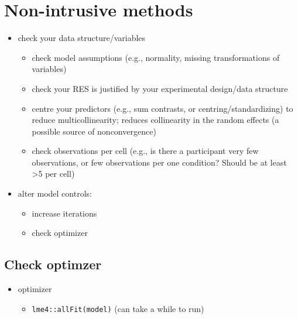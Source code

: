 \documentclass[
  letterpaper,
  DIV=11,
  numbers=noendperiod]{scrartcl}
\providecommand{\tightlist}{%
  \setlength{\itemsep}{0pt}\setlength{\parskip}{0pt}}\usepackage{longtable,booktabs,array}
\begin{document}
\hypertarget{non-intrusive-methods}{%
\section{Non-intrusive methods}\label{non-intrusive-methods}}

\begin{itemize}
\tightlist
\item
  check your data structure/variables

  \begin{itemize}
  \tightlist
  \item
    check model assumptions (e.g., normality, missing transformations of
    variables)
  \item
    check your RES is justified by your experimental design/data
    structure
  \item
    centre your predictors (e.g., sum contrasts, or
    centring/standardizing) to reduce multicollinearity; reduces
    collinearity in the random effects (a possible source of
    nonconvergence)
  \item
    check observations per cell (e.g., is there a participant very few
    observations, or few observations per one condition? Should be at
    least \textgreater5 per cell)
  \end{itemize}
\item
  alter model controls:

  \begin{itemize}
  \tightlist
  \item
    increase iterations
  \item
    check optimizer
  \end{itemize}
\end{itemize}

\hypertarget{check-optimzer}{%
\subsection{Check optimzer}\label{check-optimzer}}

\begin{itemize}
\tightlist
\item
  optimizer

  \begin{itemize}
  \tightlist
  \item
    \texttt{lme4::allFit(model)} (can take a while to run)
  \end{itemize}
\end{itemize}
\end{document}
